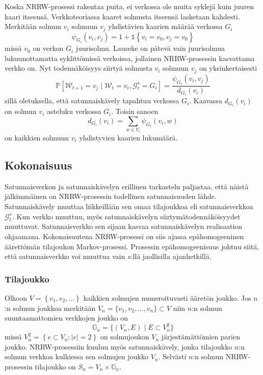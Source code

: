 \documentclass[finnish, 12pt, a4paper, sci, utf8, pdfa]{aaltothesis}
\newcommand{\Grandom}{\mathcal{G}}
\newcommand{\Wrandom}{\mathcal{W}}
\newcommand{\indicator}{\mathopen{\mathds{1}}}
\newcommand*{\prob}{\mathbb{P}}
\begin{document}
Koska NRRW-prosessi rakentaa puita, ei verkossa ole muita syklejä kuin juuren kaari itseensä. Verkkoteoriassa kaaret solmusta itseensä lasketaan kahdesti. Merkitään solmun \( v_{i} \) solmuun \( v_{j} \) yhdistävien kaarien määrää verkossa $ G_{i} $
\[
   \psi_{G_{i}}(v_{i}, v_{j}) = 1 + \indicator \left\{ v_{i} = v_{0}, v_{j} = v_{0} \right\}
   \label{equation:psi}
\]
missä $ v_{0} $ on verkon $ G_{i} $ juurisolmu. Lauseke on pätevä vain juurisolmua lukuunottamatta syklittömissä verkoissa, jollainen NRRW-prosessin kasvattama verkko on. Nyt todennäköisyys siirtyä solmusta \( v_{i} \) solmuun \( v_{j} \) on yksinkertaisesti
\begin{equation}
   \prob \left[ \Wrandom_{t+1} = v_{j} \mid \Wrandom_{t} = v_{i}, \Grandom_{t}^{s} = G_{i} \right] = \frac{\psi_{G_{i}}(v_{i}, v_{j})}{d_{G_{i}}(v_{i})}
   \label{equation:verkko-tn}
\end{equation}
sillä oletuksella, että satunnaiskävely tapahtuu verkossa $ G_{i} $. Kaavassa \( d_{G_{i}}(v_{i}) \) on solmun \( v_{i} \) asteluku verkossa $ G_{i} $. Toisin sanoen
\begin{equation}
   d_{G_{i}}(v_{i}) = \sum_{w \in V_{i}} \psi_{G_{i}}(v_{i}, w)
   \label{equation:asteluku}
\end{equation}
on kaikkien solmuun \( v_{i} \) yhdistyvien kaarien lukumäärä.

\subsection{Kokonaisuus}

Satunnaisverkon ja satunnaiskävelyn erillinen tarkastelu paljastaa, että näistä jälkimmäinen on NRRW-prosessin todellinen satunnaisuuden lähde. Satunnaiskävely muuttaa liikkeillään sen omaa tilajoukkoa eli satunnaisverkkoa \( \Grandom_{t}^{s} \). Kun verkko muuttuu, myös satunnaiskävelyn siirtymätodennäköisyydet muuttuvat. Satunnaisverkko sen sijaan kasvaa satunnaiskävelyn realisaation ohjaamana. Kokonaisuutena NRRW-prosessi on siis ajassa epähomogeeninen äärettömän tilajoukon Markov-prosessi. Prosessin epähomogeenisuus johtuu siitä, että satunnaisverkko voi muuttua vain $ s $:llä jaollisilla ajanhetkillä.

\subsubsection{Tilajoukko}

Olkoon $ V = \left\{ v_{1}, v_{2}, \ldots \right\} $ kaikkien solmujen numeroituvasti ääretön joukko. Jos $ n $:n solmun joukkoa merkitään $ V_{n} = \{ v_{1}, v_{2}, \ldots , v_{n} \} \subset V $ niin $ n $:n solmun suuntaamattomien verkkojen joukko on
\[
   \mathbb{G}_{n} = \{ (V_{n}, E) \mid E \subset V_{n}^{2}  \}
\]
missä $ V_{n}^{2} = \left\{ e \subset V_{n} : |e| = 2 \right\} $ on solmujoukon $ V_{n} $ järjestämättömien parien joukko. NRRW-prosessiin kuuluu myös satunnaiskävely, jonka tilajoukko $ n $:n solmun verkkoa kulkiessa sen solmujen joukko $ V_{n} $. Selvästi $ n $:n solmun NRRW-prosessin tilajoukko on $ S_{n} = V_{n} \times \mathbb{G}_{n} $.
\end{document}

